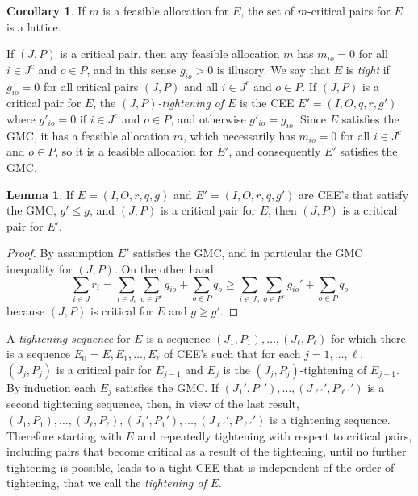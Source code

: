 \documentclass[12pt]{article}
\theoremstyle{definition}
\newtheorem{cor}{Corollary}
\newtheorem{lem}{Lemma}
\begin{document}
\begin{cor} \label{cor:mCritical}
If $m$ is a feasible allocation for $E$, the set of $m$-critical pairs for $E$ is a lattice.  
\end{cor}

If $(J,P)$ is a critical pair, then any feasible allocation $m$ has $m_{io} = 0$ for all $i \in J^c$ and $o \in P$, and in this sense $g_{io} > 0$ is illusory.  We say that $E$ is \emph{tight} if $g_{io} = 0$ for all critical pairs $(J,P)$ and all $i \in J^c$ and $o \in P$.  If $(J,P)$ is a critical pair for $E$, the \emph{$(J,P)$-tightening of $E$} is the CEE $E' = (I,O,q,r,g')$ where $g'_{io} = 0$ if $i \in J^c$ and $o \in P$, and otherwise $g'_{io} = g_{io}$.  Since $E$ satisfies the GMC, it has a feasible allocation $m$, which necessarily has $m_{io} = 0$ for all $i \in J^c$ and $o \in P$, so it is a feasible allocation for $E'$, and consequently $E'$ satisfies the GMC.

\begin{lem}
    If $E = (I,O,r,q,g)$ and $E' = (I,O,r,q,g')$ are CEE's that satisfy the GMC, $g' \le g$, and $(J,P)$ is a critical pair for $E$, then $(J,P)$ is a critical pair for $E'$.
\end{lem}

\begin{proof}
  By assumption $E'$ satisfies the GMC, and in particular the GMC inequality for $(J,P)$.  On the other hand 
  $$\sum_{i \in J} r_i = \sum_{i \in J_o} \sum_{o \in P^c} g_{io} + \sum_{o \in P} q_o \ge  \sum_{i \in J_o} \sum_{o \in P^c} g_{io}' + \sum_{o \in P} q_o$$ because $(J,P)$ is critical for $E$ and $g \ge g'$.
\end{proof}

A \emph{tightening sequence} for $E$ is a sequence $(J_1,P_1), \ldots, (J_\ell,P_\ell)$ for which there is a sequence $E_0 = E, E_1, \ldots, E_\ell$ of CEE's such that for each $j = 1, \ldots, \ell$, $(J_j,P_j)$ is a critical pair for $E_{j-1}$ and $E_j$ is the $(J_j,P_j)$-tightening of $E_{j-1}$.  By induction each $E_j$ satisfies the GMC.  If $(J_1',P_1'), \ldots, (J_{\ell'}',P_{\ell'}')$ is a second tightening sequence, then, in view of the last result, $(J_1,P_1), \ldots, (J_\ell,P_\ell),(J_1',P_1'), \ldots, (J_{\ell'}',P_{\ell'}')$ is a tightening sequence.  Therefore starting with $E$ and repeatedly tightening with respect to critical pairs, including pairs that become critical as a result of the tightening, until no further tightening is possible, leads to a tight CEE that is independent of the order of tightening, that we call the \emph{tightening of $E$}. 
\end{document}
